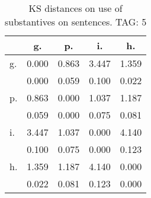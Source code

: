 \begin{table}[h!]
\begin{center}
\begin{tabular}{| l | c | c | c | c |}\hline
 & g. & p. & i. & h. \\\hline
g. & 0.000  & 0.863  & 3.447  & 1.359 \\\hline
 & 0.000  & 0.059  & 0.100  & 0.022 \\\hline
p. & 0.863  & 0.000  & 1.037  & 1.187 \\\hline
 & 0.059  & 0.000  & 0.075  & 0.081 \\\hline
i. & 3.447  & 1.037  & 0.000  & 4.140 \\\hline
 & 0.100  & 0.075  & 0.000  & 0.123 \\\hline
h. & 1.359  & 1.187  & 4.140  & 0.000 \\\hline
 & 0.022  & 0.081  & 0.123  & 0.000 \\\hline
\end{tabular}
\caption{KS distances on use of substantives on sentences. TAG: 5}
\end{center}
\end{table}